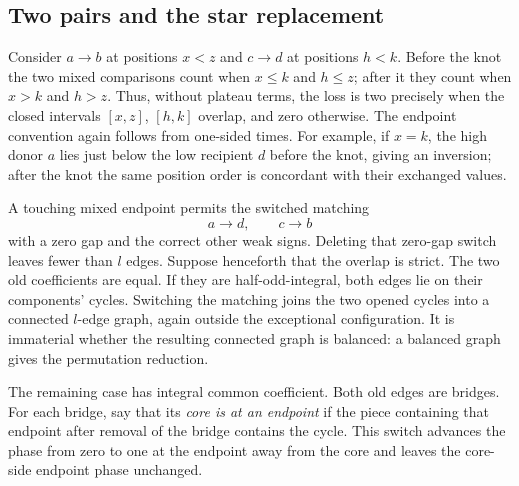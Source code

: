 \subsection{Two pairs and the star replacement}

Consider \(a\to b\) at positions \(x<z\) and \(c\to d\) at
positions \(h<k\).  Before the knot the two mixed comparisons count
when \(x\le k\) and \(h\le z\); after it they count when \(x>k\)
and \(h>z\).  Thus, without plateau terms, the loss is two precisely
when the closed intervals \([x,z]\), \([h,k]\) overlap, and zero
otherwise.  The endpoint convention again follows from one-sided
times.  For example, if \(x=k\), the high donor \(a\) lies just below
the low recipient \(d\) before the knot, giving an inversion; after
the knot the same position order is concordant with their exchanged
values.

A touching mixed endpoint permits the switched matching
\[
 a\longrightarrow d,\qquad c\longrightarrow b
\]
with a zero gap and the correct other weak signs.  Deleting that
zero-gap switch leaves fewer than \(l\) edges.  Suppose henceforth
that the overlap is strict.  The two old coefficients are equal.
If they are half-odd-integral, both edges lie on their components'
cycles.  Switching the matching joins the two opened cycles into a
connected \(l\)-edge graph, again outside the exceptional
configuration.  It is immaterial whether the resulting connected
graph is balanced: a balanced graph gives the permutation reduction.

The remaining case has integral common coefficient.  Both old edges
are bridges.  For each bridge, say that its \emph{core is at an
endpoint} if the piece containing that endpoint after removal of the
bridge contains the cycle.  This switch advances the phase from zero
to one at the endpoint away from the core and leaves the core-side
endpoint phase unchanged.


